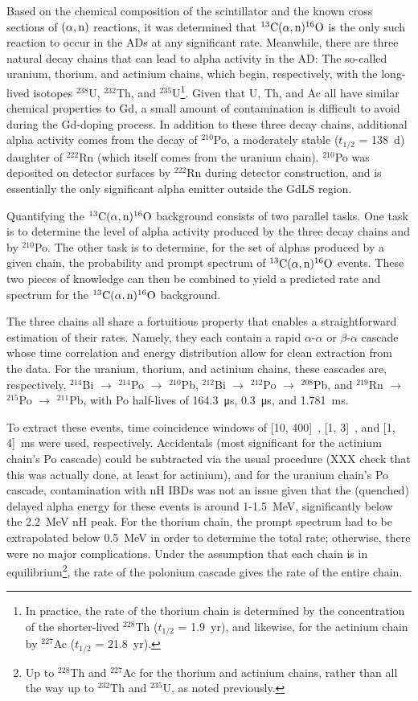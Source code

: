 \documentclass[../thesis.tex]{subfiles}
\begin{document}
Based on the chemical composition of the scintillator and the known cross
sections of $(\alpha,\mathrm{n})$ reactions, it was determined that $^{13}\mathrm{C}(\alpha, \mathrm{n})^{16}\mathrm{O}$ is the only such
reaction to occur in the ADs at any significant rate. Meanwhile, there are three
natural decay chains that can lead to alpha activity in the AD: The so-called
uranium, thorium, and actinium chains, which begin, respectively, with the
long-lived isotopes $^{238}$U, $^{232}$Th, and $^{235}$U\footnote{In practice,
  the rate of the thorium chain is determined by the concentration of the
  shorter-lived $^{228}$Th ($t_{1/2}$ = 1.9~yr), and likewise, for the actinium
  chain by $^{227}$Ac ($t_{1/2}$ = 21.8~yr).}. Given that U, Th, and Ac all have
similar chemical properties to Gd, a small amount of contamination is difficult
to avoid during the Gd-doping process. In addition to these three decay chains,
additional alpha activity comes from the decay of $^{210}$Po, a moderately
stable ($t_{1/2}$ = 138~d) daughter of $^{222}$Rn (which itself comes from the
uranium chain). $^{210}$Po was deposited on detector surfaces by $^{222}$Rn
during detector construction, and is essentially the only significant alpha
emitter outside the GdLS region.

Quantifying the $^{13}\mathrm{C}(\alpha, \mathrm{n})^{16}\mathrm{O}$ background consists of two parallel tasks. One task is
to determine the level of alpha activity produced by the three decay chains and
by $^{210}$Po. The other task is to determine, for the set of alphas produced by
a given chain, the probability and prompt spectrum of $^{13}\mathrm{C}(\alpha, \mathrm{n})^{16}\mathrm{O}$ events. These two
pieces of knowledge can then be combined to yield a predicted rate and spectrum
for the $^{13}\mathrm{C}(\alpha, \mathrm{n})^{16}\mathrm{O}$ background.

The three chains all share a fortuitious property that enables a straightforward
estimation of their rates. Namely, they each contain a rapid $\alpha$-$\alpha$
or $\beta$-$\alpha$ cascade whose time correlation and energy distribution allow
for clean extraction from the data. For the uranium, thorium, and actinium
chains, these cascades are, respectively, $^{214}$Bi $\to$ $^{214}$Po $\to$
$^{210}$Pb, $^{212}$Bi $\to$ $^{212}$Po $\to$ $^{208}$Pb, and $^{219}$Rn $\to$
$^{215}$Po $\to$ $^{211}$Pb, with Po half-lives of \SI{164.3}{\micro s},
\SI{0.3}{\micro s}, and \SI{1.781}{ms}.

To extract these events, time coincidence windows of [10, 400]~\us, [1, 3]~\us,
and [1, 4]~ms were used, respectively. Accidentals (most significant for the
actinium chain's Po cascade) could be subtracted via the usual procedure (XXX
check that this was actually done, at least for actinium), and for the uranium
chain's Po cascade, contamination with nH IBDs was not an issue given that the
(quenched) delayed alpha energy for these events is around 1-1.5~MeV,
significantly below the 2.2~MeV nH peak. For the thorium chain, the prompt
spectrum had to be extrapolated below 0.5~MeV in order to determine the total
rate; otherwise, there were no major complications. Under the assumption that
each chain is in equilibrium\footnote{Up to $^{228}$Th and $^{227}$Ac for the
  thorium and actinium chains, rather than all the way up to $^{232}$Th and
  $^{235}$U, as noted previously.}, the rate of the polonium cascade gives the
rate of the entire chain.
\end{document}
